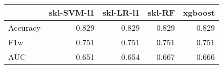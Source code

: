 \begin{tabular}{lrrrr}
\toprule
{} &  skl-SVM-l1 &  skl-LR-l1 &  skl-RF &  xgboost \\
\midrule
Accuracy &       0.829 &      0.829 &   0.829 &    0.829 \\
F1w      &       0.751 &      0.751 &   0.751 &    0.751 \\
AUC      &       0.651 &      0.654 &   0.667 &    0.666 \\
\bottomrule
\end{tabular}
